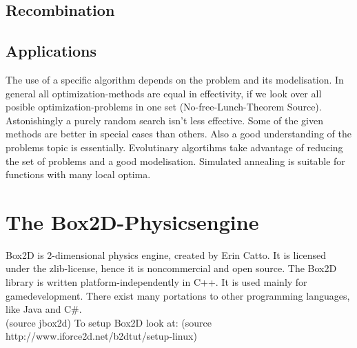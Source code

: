 \documentclass[10pt,a4paper,DIV=11]{scrreprt}
\begin{document}
\section{Recombination}



\section{Applications}
The use of a specific algorithm depends on the problem and its modelisation. In general all optimization-methods are equal in effectivity, if we look over all posible optimization-problems in one set (No-free-Lunch-Theorem Source). Astonishingly a purely random search isn't less effective.
Some of the given methods are better in special cases than others. Also a good understanding of the problems topic is essentially. Evolutinary algortihms take advantage of reducing the set of problems and a good modelisation.
Simulated annealing is suitable for functions with many local optima.











\chapter{The Box2D-Physicsengine}
Box2D is 2-dimensional physics engine, created by Erin Catto. It is licensed under the zlib-license, hence it is noncommercial and open source. The Box2D library is written platform-independently in C++. It is used mainly for gamedevelopment. There exist many portations to other programming languages, like Java and C\#. \\
(source jbox2d)
To setup Box2D look at:
(source http://www.iforce2d.net/b2dtut/setup-linux)
\end{document}
